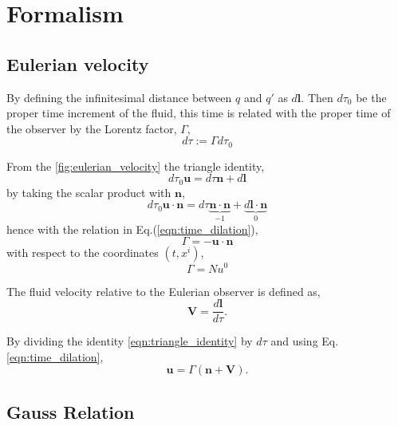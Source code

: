 \chapter{Formalism}

\section{Eulerian velocity}
\label{app:eulerian}

By defining the infinitesimal distance between $q$ and $q'$ as $d\mathbf{l}$. Then $d\tau_0$ be the proper time increment of the fluid, this time is related with the proper time of the observer by the Lorentz factor, $\Gamma$,
\begin{equation}
    d\tau := \Gamma d\tau_0
    \label{eqn:time_dilation}
\end{equation}

From the \cref{fig:eulerian_velocity} the triangle identity,
\begin{equation}
    d\tau_0 \mathbf{u} = d\tau \mathbf{n} + d\mathbf{l}
    \label{eqn:triangle_identity}
\end{equation}
by taking the scalar product with $\mathbf{n}$,
\begin{equation}
    d\tau_0 \mathbf{u} \cdot \mathbf{n} = d\tau \underbrace{\mathbf{n} \cdot \mathbf{n}}_{-1} + \underbrace{d\mathbf{l} \cdot \mathbf{n}}_{0}
\end{equation}
hence with the relation in Eq.(\ref{eqn:time_dilation}),
\begin{equation}
    \Gamma=-\mathbf{u} \cdot \mathbf{n}
\end{equation}
with respect to the coordinates $(t,x^i)$,
\begin{equation}
    \Gamma = Nu^0
\end{equation}

The fluid velocity relative to the Eulerian observer is defined as,
\begin{equation}
    \mathbf{V}=\frac{d\mathbf{l}}{d\tau}.
    \label{eqn:definition_eulerian_fluid_velocity}
\end{equation}

By dividing the identity \ref{eqn:triangle_identity} by $d\tau$ and using Eq.\ref{eqn:time_dilation},
\begin{equation}
    \mathbf{u}=\Gamma(\mathbf{n}+\mathbf{V}).
    \label{eqn:general_fluid_expression}
\end{equation}



\section{Gauss Relation}
\label{app:gauss}

